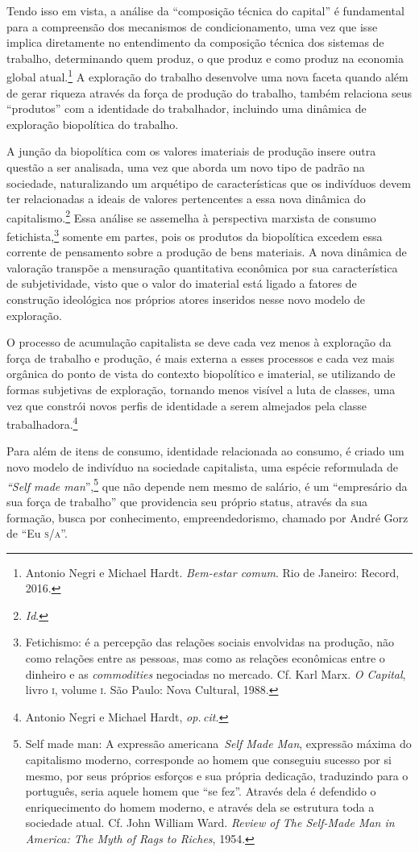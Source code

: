 Tendo isso em vista, a análise da ``composição técnica do capital'' é
fundamental para a compreensão dos mecanismos de condicionamento, uma
vez que isse implica diretamente no entendimento da composição técnica
dos sistemas de trabalho, determinando quem produz, o que produz e como
produz na economia global atual.\footnote{Antonio Negri e Michael Hardt. \emph{Bem-estar comum}. Rio de Janeiro: Record, 2016.} A exploração do
trabalho desenvolve uma nova faceta quando além de gerar riqueza através
da força de produção do trabalho, também relaciona seus ``produtos'' com
a identidade do trabalhador, incluindo uma dinâmica de exploração
biopolítica do trabalho.

A junção da biopolítica com os valores imateriais de produção insere
outra questão a ser analisada, uma vez que aborda um novo tipo de padrão
na sociedade, naturalizando um arquétipo de características que os
indivíduos devem ter relacionadas a ideais de valores pertencentes a
essa nova dinâmica do capitalismo.\footnote{\textit{Id}.} Essa análise
se assemelha à perspectiva marxista de consumo fetichista,\footnote{Fetichismo:
  é a percepção das relações sociais envolvidas na produção, não como
  relações entre as pessoas, mas como as relações econômicas entre o
  dinheiro e as \emph{commodities} negociadas no mercado. Cf. Karl Marx. \emph{O Capital}, livro \textsc{i}, volume \textsc{i}. São Paulo: Nova Cultural, 1988.}
somente em partes, pois os produtos da biopolítica excedem essa corrente
de pensamento sobre a produção de bens materiais. A nova dinâmica de
valoração transpõe a mensuração quantitativa econômica por sua
característica de subjetividade, visto que o valor do imaterial está
ligado a fatores de construção ideológica nos próprios atores inseridos
nesse novo modelo de exploração.

O processo de acumulação capitalista se deve cada vez menos à exploração
da força de trabalho e produção, é mais externa a esses processos e cada
vez mais orgânica do ponto de vista do contexto biopolítico e imaterial,
se utilizando de formas subjetivas de exploração, tornando menos visível
a luta de classes, uma vez que constrói novos perfis de identidade a
serem almejados pela classe trabalhadora.\footnote{Antonio Negri e Michael Hardt, \textit{op.\,cit.}}

Para além de itens de consumo, identidade relacionada ao consumo, é
criado um novo modelo de indivíduo na sociedade capitalista, uma espécie
reformulada de \emph{``Self made man}'',\footnote{Self made man: A
  expressão americana~\emph{Self Made Man}, expressão máxima do
  capitalismo moderno, corresponde ao homem que conseguiu sucesso por si
  mesmo, por seus próprios esforços e sua própria dedicação, traduzindo
  para o português, seria aquele homem que ``se fez''. Através dela é
  defendido o enriquecimento do homem moderno, e através dela se
  estrutura toda a sociedade atual. Cf. John William Ward. \emph{Review of The Self-Made Man in America: The Myth of Rags to Riches}, 1954.} que não
depende nem mesmo de salário, é um ``empresário da sua força de
trabalho'' que providencia seu próprio status, através da sua formação,
busca por conhecimento, empreendedorismo, chamado por André Gorz de ``Eu
\textsc{s}/\textsc{a}''.

